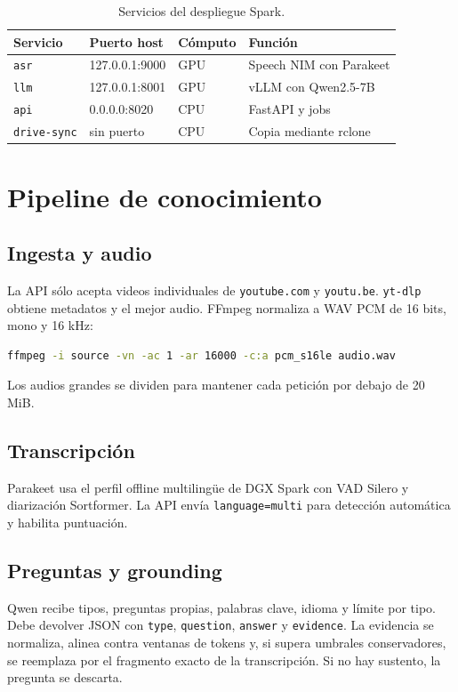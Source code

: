 \documentclass[11pt,a4paper]{article}
\begin{document}
\begin{table}[htbp]
  \centering
  \caption{Servicios del despliegue Spark.}
  \begin{tabularx}{\textwidth}{@{}l l l X@{}}
    \toprule
    Servicio & Puerto host & Cómputo & Función \\
    \midrule
    \texttt{asr} & 127.0.0.1:9000 & GPU & Speech NIM con Parakeet \\
    \texttt{llm} & 127.0.0.1:8001 & GPU & vLLM con Qwen2.5-7B \\
    \texttt{api} & 0.0.0.0:8020 & CPU & FastAPI y jobs \\
    \texttt{drive-sync} & sin puerto & CPU & Copia mediante rclone \\
    \bottomrule
  \end{tabularx}
\end{table}

\section{Pipeline de conocimiento}

\subsection{Ingesta y audio}
La API sólo acepta videos individuales de \texttt{youtube.com} y
\texttt{youtu.be}. \texttt{yt-dlp} obtiene metadatos y el mejor audio. FFmpeg
normaliza a WAV PCM de 16 bits, mono y 16 kHz:

\begin{lstlisting}[language=bash]
ffmpeg -i source -vn -ac 1 -ar 16000 -c:a pcm_s16le audio.wav
\end{lstlisting}

Los audios grandes se dividen para mantener cada petición por debajo de 20 MiB.

\subsection{Transcripción}
Parakeet usa el perfil offline multilingüe de DGX Spark con VAD Silero y
diarización Sortformer. La API envía \texttt{language=multi} para detección
automática y habilita puntuación.

\subsection{Preguntas y grounding}
Qwen recibe tipos, preguntas propias, palabras clave, idioma y límite por tipo.
Debe devolver JSON con \texttt{type}, \texttt{question}, \texttt{answer} y
\texttt{evidence}. La evidencia se normaliza, alinea contra ventanas de tokens y,
si supera umbrales conservadores, se reemplaza por el fragmento exacto de la
transcripción. Si no hay sustento, la pregunta se descarta.
\end{document}
